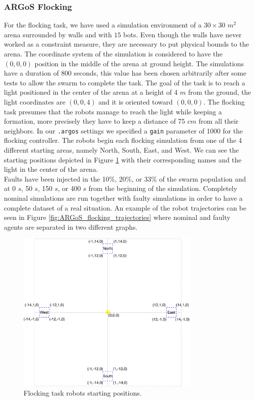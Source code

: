 \documentclass[../../Thesis.tex]{subfiles}
\begin{document}
			\subsubsection{ARGoS Flocking}
			\label{sec:argos_flocking_simulation_parameters} %
				For the flocking task, we have used a simulation environment of a $30 \times 30$ $m^2$ arena surrounded by walls and with $15$ bots. Even though the walls have never worked as a constraint measure, they are necessary to put physical bounds to the arena. The coordinate system of the simulation is considered to have the $(0,0,0)$ position in the middle of the arena at ground height. The simulations have a duration of $800$ seconds, this value has been chosen arbitrarily after some tests to allow the swarm to complete the task. The goal of the task is to reach a light positioned in the center of the arena at a height of 4 $m$ from the ground, the light coordinates are $(0,0,4)$ and it is oriented toward $(0,0,0)$. The flocking task presumes that the robots manage to reach the light while keeping a formation, more precisely they have to keep a distance of 75 $cm$ from all their neighbors. In our \verb|.argos| settings we specified a \verb|gain| parameter of 1000 for the flocking controller.  The robots begin each flocking simulation from one of the 4 different starting areas, namely North, South, East, and West. We can see the starting positions depicted in Figure \ref{fig:flocking_starting_positions} with their corresponding names and the light in the center of the arena.\\
				Faults have been injected in the 10\%, 20\%, or 33\% of the swarm population and at 0 $s$, 50 $s$, 150 $s$, or 400 $s$ from the beginning of the simulation. Completely nominal simulations are run together with faulty simulations in order to have a complete dataset of a real situation. An example of the robot trajectories can be seen in Figure \ref{fig:ARGoS_flocking_trajectories} where nominal and faulty agents are separated in two different graphs.
				\begin{figure}
				    \centering
				    \includegraphics[width=0.8\textwidth]{../../Images/Fault_detection/flocking_coordinates.pdf}
				    \caption{Flocking task robots starting positions.}
				    \label{fig:flocking_starting_positions}
				\end{figure}
\end{document}
